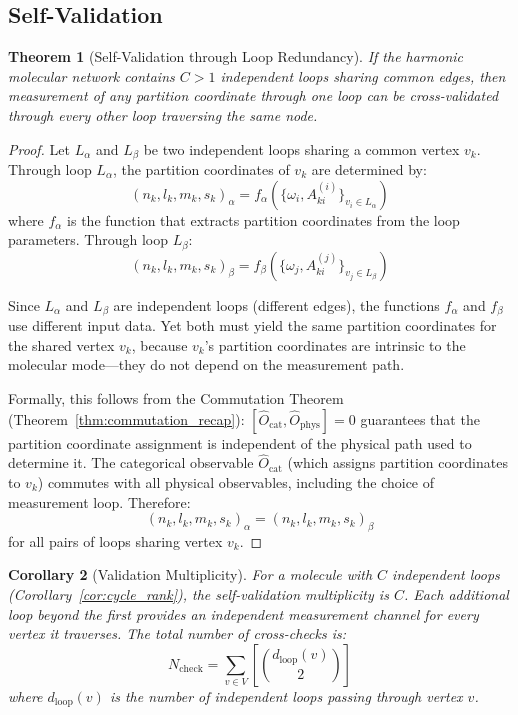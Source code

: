 \documentclass[11pt,a4paper]{article}
\newtheorem{theorem}{Theorem}[section]
\newtheorem{corollary}[theorem]{Corollary}
\theoremstyle{definition}
\theoremstyle{remark}
\newcommand{\Aki}{A_{ki}}
\begin{document}
\subsection{Self-Validation}

\begin{theorem}[Self-Validation through Loop Redundancy]
\label{thm:self_validation}
If the harmonic molecular network contains $C > 1$ independent loops sharing common edges, then measurement of any partition coordinate through one loop can be cross-validated through every other loop traversing the same node.
\end{theorem}

\begin{proof}
Let $L_\alpha$ and $L_\beta$ be two independent loops sharing a common vertex $v_k$. Through loop $L_\alpha$, the partition coordinates of $v_k$ are determined by:
\begin{equation}
(n_k, l_k, m_k, s_k)_\alpha = f_\alpha(\{\omega_i, \Aki^{(i)}\}_{v_i \in L_\alpha})
\end{equation}
where $f_\alpha$ is the function that extracts partition coordinates from the loop parameters. Through loop $L_\beta$:
\begin{equation}
(n_k, l_k, m_k, s_k)_\beta = f_\beta(\{\omega_j, \Aki^{(j)}\}_{v_j \in L_\beta})
\end{equation}

Since $L_\alpha$ and $L_\beta$ are independent loops (different edges), the functions $f_\alpha$ and $f_\beta$ use different input data. Yet both must yield the same partition coordinates for the shared vertex $v_k$, because $v_k$'s partition coordinates are intrinsic to the molecular mode---they do not depend on the measurement path.

Formally, this follows from the Commutation Theorem (Theorem~\ref{thm:commutation_recap}): $[\hat{O}_{\mathrm{cat}}, \hat{O}_{\mathrm{phys}}] = 0$ guarantees that the partition coordinate assignment is independent of the physical path used to determine it. The categorical observable $\hat{O}_{\mathrm{cat}}$ (which assigns partition coordinates to $v_k$) commutes with all physical observables, including the choice of measurement loop. Therefore:
\begin{equation}
(n_k, l_k, m_k, s_k)_\alpha = (n_k, l_k, m_k, s_k)_\beta
\end{equation}
for all pairs of loops sharing vertex $v_k$.
\end{proof}

\begin{corollary}[Validation Multiplicity]
\label{cor:validation_multiplicity}
For a molecule with $C$ independent loops (Corollary~\ref{cor:cycle_rank}), the self-validation multiplicity is $C$. Each additional loop beyond the first provides an independent measurement channel for every vertex it traverses. The total number of cross-checks is:
\begin{equation}
N_{\mathrm{check}} = \sum_{v \in V} \left[ \binom{d_{\mathrm{loop}}(v)}{2} \right]
\end{equation}
where $d_{\mathrm{loop}}(v)$ is the number of independent loops passing through vertex $v$.
\end{corollary}
\end{document}
